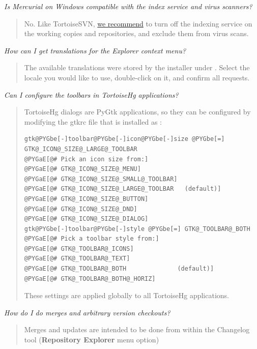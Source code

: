 \documentclass[letterpaper,10pt,english]{manual}
\begin{document}
\emph{Is Mercurial on Windows compatible with the index service and virus scanners?}
\begin{quote}

No. Like TortoiseSVN, \href{http://www.selenic.com/pipermail/mercurial/2010-January/029680.html}{we recommend}
to turn off the indexing service on the working copies and repositories,
and exclude them from virus scans.
\end{quote}

\emph{How can I get translations for the Explorer context menu?}
\begin{quote}

The available translations were stored by the installer under
.  Select the
locale you would like to use, double-click on it, and confirm all
requests.
\end{quote}

\emph{Can I configure the toolbars in TortoiseHg applications?}
\begin{quote}

TortoiseHg dialogs are PyGtk applications, so they can be configured by
modifying the gtkrc file that is installed as
:

\begin{Verbatim}[commandchars=@\[\]]
gtk@PYGbe[-]toolbar@PYGbe[-]icon@PYGbe[-]size @PYGbe[=] GTK@_ICON@_SIZE@_LARGE@_TOOLBAR
@PYGaE[@# Pick an icon size from:]
@PYGaE[@# GTK@_ICON@_SIZE@_MENU]
@PYGaE[@# GTK@_ICON@_SIZE@_SMALL@_TOOLBAR]
@PYGaE[@# GTK@_ICON@_SIZE@_LARGE@_TOOLBAR   (default)]
@PYGaE[@# GTK@_ICON@_SIZE@_BUTTON]
@PYGaE[@# GTK@_ICON@_SIZE@_DND]
@PYGaE[@# GTK@_ICON@_SIZE@_DIALOG]
gtk@PYGbe[-]toolbar@PYGbe[-]style @PYGbe[=] GTK@_TOOLBAR@_BOTH
@PYGaE[@# Pick a toolbar style from:]
@PYGaE[@# GTK@_TOOLBAR@_ICONS]
@PYGaE[@# GTK@_TOOLBAR@_TEXT]
@PYGaE[@# GTK@_TOOLBAR@_BOTH              (default)]
@PYGaE[@# GTK@_TOOLBAR@_BOTH@_HORIZ]
\end{Verbatim}

These settings are applied globally to all TortoiseHg applications.
\end{quote}

\emph{How do I do merges and arbitrary version checkouts?}
\begin{quote}

Merges and updates are intended to be done from within the Changelog
tool (\textbf{Repository Explorer} menu option)
\end{quote}
\end{document}
